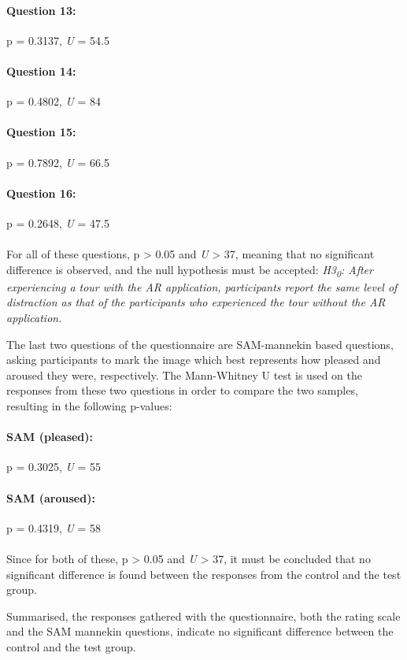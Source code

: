 \paragraph{Question 13:} p = 0.3137, \textit{U} = 54.5
\paragraph{Question 14:} p = 0.4802, \textit{U} = 84
\paragraph{Question 15:} p = 0.7892, \textit{U} = 66.5
\paragraph{Question 16:} p = 0.2648, \textit{U} = 47.5\\
\\
For all of these questions, p > 0.05 and \textit{U} > 37, meaning that no significant difference is observed, and the null hypothesis must be accepted: \textit{H3\textsubscript{0}: After experiencing a tour with the AR application, participants report the same level of distraction as that of the participants who experienced the tour without the AR application.}

The last two questions of the questionnaire are SAM-mannekin based questions, asking participants to mark the image which best represents how pleased and aroused they were, respectively. The Mann-Whitney U test is used on the responses from these two questions in order to compare the two samples, resulting in the following p-values:

\paragraph{SAM (pleased):} p = 0.3025, \textit{U} = 55
\paragraph{SAM (aroused):} p = 0.4319, \textit{U} = 58\\
\\
Since for both of these, p > 0.05 and \textit{U} > 37, it must be concluded that no significant difference is found between the responses from the control and the test group.

Summarised, the responses gathered with the questionnaire, both the rating scale and the SAM mannekin questions, indicate no significant difference between the control and the test group.

